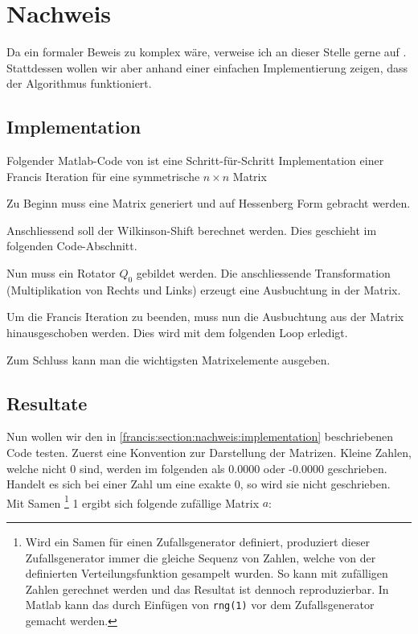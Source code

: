 \section{Nachweis\label{francis:section:nachweis}}

Da ein formaler Beweis zu komplex wäre, verweise ich an dieser Stelle gerne auf \cite{francis:watkins_book}.
Stattdessen wollen wir aber anhand einer einfachen Implementierung zeigen, dass der Algorithmus funktioniert.

\subsection{Implementation\label{francis:section:nachweis:implementation}}
Folgender Matlab-Code von \cite{francis:watkins_book} ist eine Schritt-für-Schritt Implementation einer Francis Iteration für eine symmetrische $n \times n$ Matrix 

Zu Beginn muss eine Matrix generiert und auf Hessenberg Form gebracht werden.

Anschliessend soll der Wilkinson-Shift berechnet werden.
Dies geschieht im folgenden Code-Abschnitt.

Nun muss ein Rotator $Q_0$ gebildet werden.
Die anschliessende Transformation (Multiplikation von Rechts und Links) erzeugt eine Ausbuchtung in der Matrix.

Um die Francis Iteration zu beenden, muss nun die Ausbuchtung aus der Matrix hinausgeschoben werden.
Dies wird mit dem folgenden Loop erledigt.

Zum Schluss kann man die wichtigsten Matrixelemente ausgeben.


\subsection{Resultate\label{francis:section:nachweis:resultate}}
Nun wollen wir den in \ref{francis:section:nachweis:implementation} beschriebenen Code testen.
Zuerst eine Konvention zur Darstellung der Matrizen. 
Kleine Zahlen, welche nicht 0 sind, werden im folgenden als 0.0000 oder -0.0000 geschrieben.
Handelt es sich bei einer Zahl um eine exakte 0, so wird sie nicht geschrieben.
Mit Samen \footnote{Wird ein Samen für einen Zufallsgenerator definiert, produziert dieser Zufallsgenerator immer die gleiche Sequenz von Zahlen, welche von der definierten Verteilungsfunktion gesampelt wurden.
So kann mit zufälligen Zahlen gerechnet werden und das Resultat ist dennoch reproduzierbar.
In Matlab kann das durch Einfügen von \texttt{rng(1)} vor dem Zufallsgenerator gemacht werden.}
1 ergibt sich folgende zufällige Matrix $a$:

